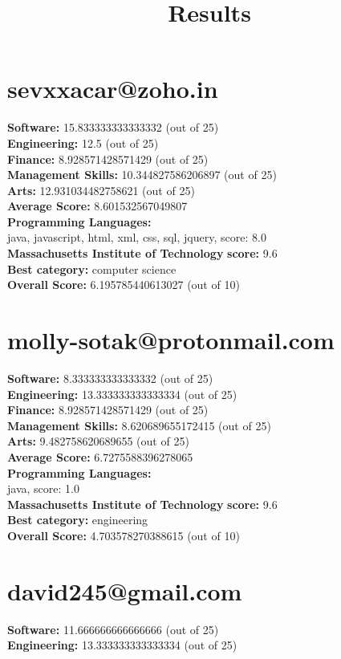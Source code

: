 \documentclass{article}
\title{Results}
\begin{document}
\section{sevxxacar@zoho.in}
\textbf{Software:} 15.833333333333332 (out of 25)\\
\textbf{Engineering: } 12.5 (out of 25)\\
\textbf{Finance:} 8.928571428571429 (out of 25)\\
\textbf{Management Skills:} 10.344827586206897 (out of 25)\\
\textbf{Arts:} 12.931034482758621 (out of 25)\\
\textbf{Average Score: } 8.601532567049807\\
\textbf{Programming Languages:} \\
java, javascript, html, xml, css, sql, jquery, score: 8.0\\
\textbf{Massachusetts Institute of Technology} \textbf{score:} 9.6\\
\textbf{Best category: } computer science\\
\textbf{Overall Score: }6.195785440613027 (out of 10)\section{molly-sotak@protonmail.com}
\textbf{Software:} 8.333333333333332 (out of 25)\\
\textbf{Engineering: } 13.333333333333334 (out of 25)\\
\textbf{Finance:} 8.928571428571429 (out of 25)\\
\textbf{Management Skills:} 8.620689655172415 (out of 25)\\
\textbf{Arts:} 9.482758620689655 (out of 25)\\
\textbf{Average Score: } 6.7275588396278065\\
\textbf{Programming Languages:} \\
java, score: 1.0\\
\textbf{Massachusetts Institute of Technology} \textbf{score:} 9.6\\
\textbf{Best category: } engineering\\
\textbf{Overall Score: }4.703578270388615 (out of 10)\section{david245@gmail.com}
\textbf{Software:} 11.666666666666666 (out of 25)\\
\textbf{Engineering: } 13.333333333333334 (out of 25)\\
\end{document}
